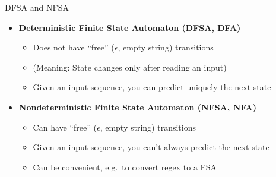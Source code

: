 \documentclass{beamer}
\def\dx{1cm} \def\dy{1.5cm}
\newcommand{\newState}[4]{\node[state,#3](#1)[#4]{#2};}
\newcommand{\newTransition}[4]{\path[->] (#1) edge [#4] node {#3} (#2);}
\begin{document}
\begin{frame}{DFSA and NFSA}
  \begin{itemize}\small
  \item \textbf{Deterministic Finite State Automaton (DFSA, DFA)}
    \begin{itemize}
    \item Does not have ``free'' ($\epsilon$, empty string) transitions
    \item (Meaning: State changes only after reading an input)
    \item Given an input sequence, you can predict uniquely the next state
    \end{itemize}
  \end{itemize}
  \begin{center}
  \end{center}
  \small
  \begin{itemize}
  \item \textbf{Nondeterministic Finite State Automaton (NFSA, NFA)}
    \begin{itemize}
    \item Can have ``free'' ($\epsilon$, empty string) transitions
    \item Given an input sequence, you can't always predict the next state
    \item Can be convenient, e.g.\ to convert regex to a FSA
    \end{itemize}
  \end{itemize}
  \begin{center}
  \end{center}
\end{frame}
\end{document}
